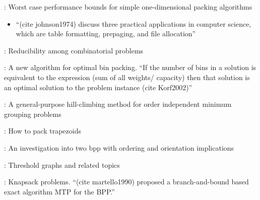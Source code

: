 \documentclass[oribibl]{llncs}
\begin{document}
\cite{johnson1974}: Worst case performance bounds for simple one-dimensional packing algorithms
\begin{itemize}
	\item ``(cite johnson1974) discuss three practical applications in computer science, which are table formatting, prepaging, and file allocation''
\end{itemize}

\cite{karp1972}: Reducibility among combinatorial problems

\cite{korf2002}: A new algorithm for optimal bin packing. ``If the number of bins in a solution is equivalent to the expression (sum of all weights/ capacity) then that solution is an optimal solution to the problem instance (cite Korf2002)'' 

\cite{lewis2009}: A general-purpose hill-climbing method for order independent minimum grouping problems

\cite{lewis2017}: How to pack trapezoids

\cite{lewis2011}: An investigation into two bpp with ordering and orientation implications

\cite{mahadev1995}: Threshold graphs and related topics

\cite{martello1990}: Knapsack problems. ``(cite martello1990) proposed a branch-and-bound based exact algorithm MTP for the BPP.'' 






%
\end{document}

